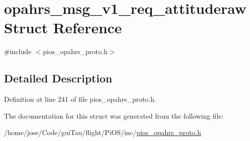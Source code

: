 \hypertarget{structopahrs__msg__v1__req__attituderaw}{\section{opahrs\-\_\-msg\-\_\-v1\-\_\-req\-\_\-attituderaw Struct Reference}
\label{structopahrs__msg__v1__req__attituderaw}
}


{\ttfamily \#include $<$pios\-\_\-opahrs\-\_\-proto.\-h$>$}



\subsection{Detailed Description}


Definition at line 241 of file pios\-\_\-opahrs\-\_\-proto.\-h.



The documentation for this struct was generated from the following file\-:\begin{DoxyCompactItemize}
\item 
/home/jose/\-Code/gui\-Tau/flight/\-Pi\-O\-S/inc/\hyperlink{pios__opahrs__proto_8h}{pios\-\_\-opahrs\-\_\-proto.\-h}\end{DoxyCompactItemize}

